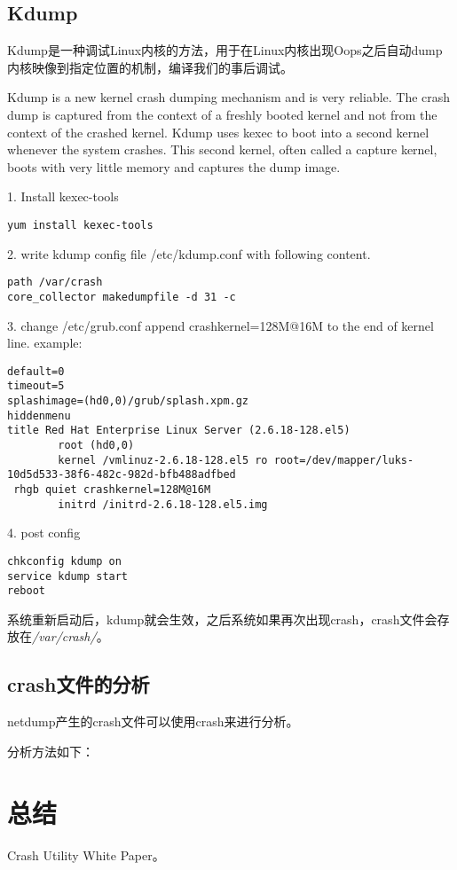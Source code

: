 \subsection{Kdump}

Kdump是一种调试Linux内核的方法，用于在Linux内核出现Oops之后自动dump内核映像到指定位置的机制，编译我们的事后调试。

Kdump is a new kernel crash dumping mechanism and is very reliable. The crash dump is
captured from the context of a freshly booted kernel and not from the context of the crashed
kernel. Kdump uses kexec to boot into a second kernel whenever the system crashes. This
second kernel, often called a capture kernel, boots with very little memory and captures the
dump image.

1. Install kexec-tools

\begin{lstlisting}
yum install kexec-tools
\end{lstlisting}

2. write kdump config file /etc/kdump.conf with following content.

\begin{lstlisting}
path /var/crash
core_collector makedumpfile -d 31 -c
\end{lstlisting}

3. change /etc/grub.conf append crashkernel=128M@16M to the end of kernel line. example:

\begin{lstlisting}
default=0
timeout=5
splashimage=(hd0,0)/grub/splash.xpm.gz
hiddenmenu
title Red Hat Enterprise Linux Server (2.6.18-128.el5)
        root (hd0,0)
        kernel /vmlinuz-2.6.18-128.el5 ro root=/dev/mapper/luks-10d5d533-38f6-482c-982d-bfb488adfbed
 rhgb quiet crashkernel=128M@16M
        initrd /initrd-2.6.18-128.el5.img
\end{lstlisting}

4. post config

\begin{lstlisting}
chkconfig kdump on
service kdump start
reboot
\end{lstlisting}

系统重新启动后，kdump就会生效，之后系统如果再次出现crash，crash文件会存放在\emph{/var/crash/}。


\subsection{crash文件的分析}

netdump产生的crash文件可以使用crash来进行分析。

分析方法如下：

\section{总结}

Crash Utility White Paper\cite{crash-white-paper}。

